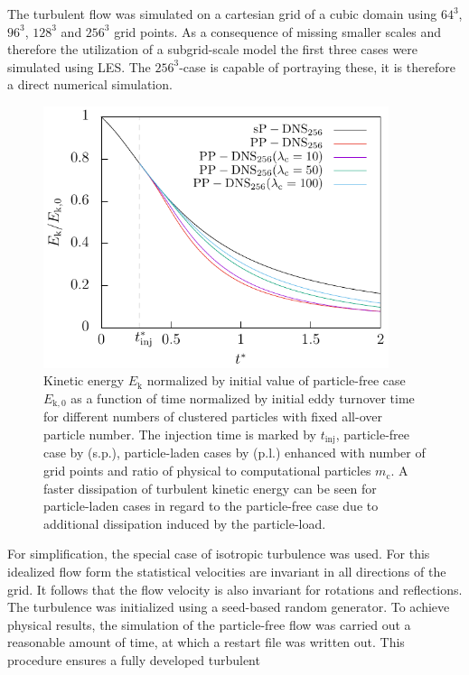 \documentclass[11pt,a4paper,openany,oneside,parskip=half*]{article}
\begin{document}
The turbulent flow was simulated on a cartesian grid of a cubic domain using $64^3$, $96^3$, $128^3$ and $256^3$ grid points. As a consequence of missing smaller scales and therefore the utilization of a subgrid-scale model the first three cases were simulated using LES. The $256^3$-case is capable of portraying these, it is therefore a direct numerical simulation. 
\begin{figure}[h]
	\centering
  \includegraphics[width=0.9\textwidth]{./Abbildungen/256/kineticEnergy_time.pdf}
	\caption{Kinetic energy $E_\mathrm{k}$ normalized by initial value of particle-free case $E_\mathrm{k,0}$ as a function of time normalized by initial eddy turnover time for different numbers of clustered particles with fixed all-over particle number. The injection time is marked by $t_\mathrm{inj}$, particle-free case by (s.p.), particle-laden cases by (p.l.) enhanced with number of grid points and ratio of physical to computational particles $m_\mathrm{c}$. A faster dissipation of turbulent kinetic energy can be seen for particle-laden cases in regard to the particle-free case due to additional dissipation induced by the particle-load.}
	\label{kineticEnergy_time_128}
\end{figure}
\newline
For simplification, the special case of isotropic turbulence was used. For this idealized flow form the statistical 
velocities are invariant in all directions of the grid. It follows that the flow velocity is also invariant for rotations and reflections. 
The turbulence was initialized using a seed-based random generator. To achieve physical results, the simulation of the particle-free flow was carried out a reasonable amount of time, 
at which a restart file was written out. This procedure ensures a fully developed turbulent 
\end{document}
